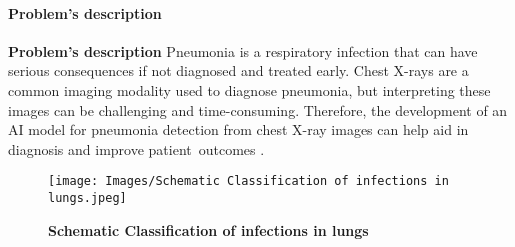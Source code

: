 %
%
%
%




{ 
  \framesubtitle{Problem's description}	
   
   \textbf{Problem's description}\newline 
    Pneumonia is a respiratory infection that can have serious consequences if not diagnosed and treated early. Chest X-rays are a common imaging modality used to diagnose pneumonia, but interpreting these images can be challenging and time-consuming. Therefore, the development of an AI model for pneumonia detection from chest X-ray images can help aid in diagnosis and improve patient outcomes \cite{Zhou:2018}. \newpage
    
    \begin{figure}[h!]
    	\texttt{[image: Images/Schematic Classification of infections in lungs.jpeg]}
    	\caption{\textbf{Schematic Classification of infections in lungs \cite{Lim:2022}}}
    	\label{Schematic Classification of infections in lungs.}
    \end{figure}

}

